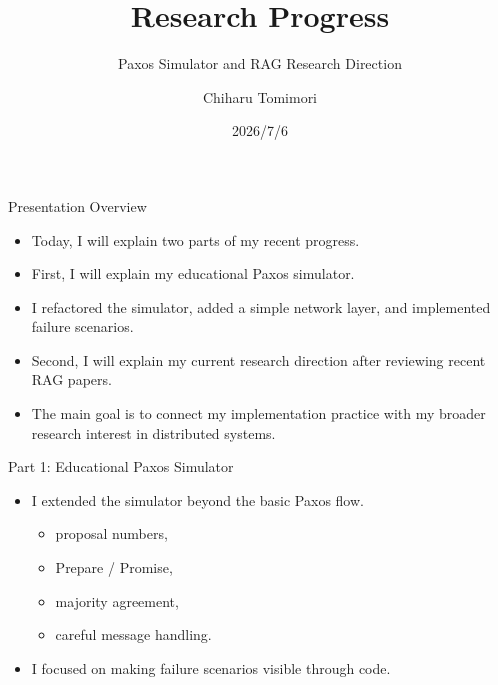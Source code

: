 \documentclass[aspectratio=169]{beamer}
\title{Research Progress}
\subtitle{Paxos Simulator and RAG Research Direction}
\author{Chiharu Tomimori}
\date{2026/7/6}
\begin{document}
\begin{frame}
  \titlepage
\end{frame}

\begin{frame}{Presentation Overview}
  \begin{itemize}
    \item Today, I will explain two parts of my recent progress.
    \item First, I will explain my educational Paxos simulator.
    \item I refactored the simulator, added a simple network layer, and implemented failure scenarios.
    \item Second, I will explain my current research direction after reviewing recent RAG papers.
    \item The main goal is to connect my implementation practice with my broader research interest in distributed systems.
  \end{itemize}
\end{frame}

\begin{frame}{Part 1: Educational Paxos Simulator}
  \begin{itemize}
    \item I extended the simulator beyond the basic Paxos flow.
    \begin{itemize}
      \item proposal numbers,
      \item Prepare / Promise,
      \item majority agreement,
      \item careful message handling.
    \end{itemize}
    \item I focused on making failure scenarios visible through code.
  \end{itemize}
\end{frame}
\end{document}
